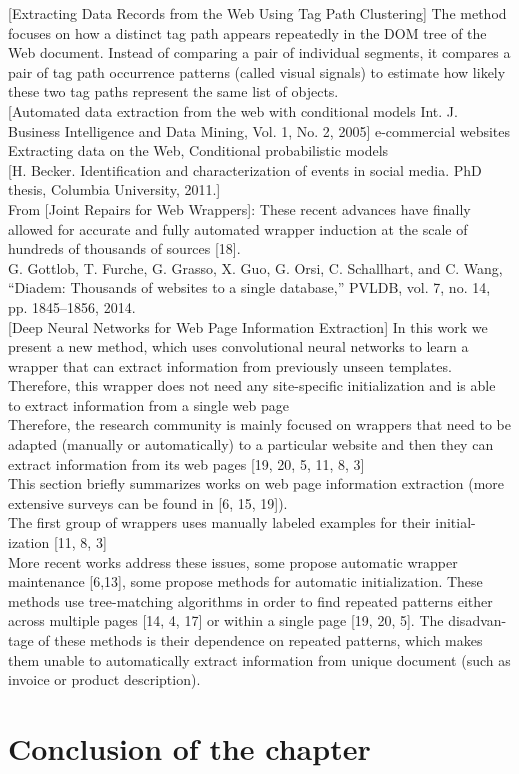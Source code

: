 [Extracting Data Records from the Web Using Tag Path Clustering]
The method focuses on how a distinct tag path appears repeatedly in the DOM tree of the Web document. Instead of comparing a pair of individual segments, it compares a pair of tag path occurrence patterns (called visual signals) to estimate how likely these two tag paths represent the same list of objects.\\

[Automated data extraction from the web with conditional models Int. J. Business Intelligence and Data Mining, Vol. 1, No. 2, 2005] e-commercial websites Extracting data on the Web, Conditional probabilistic models\\


[H. Becker. Identification and characterization of events in social media. PhD thesis, Columbia University, 2011.]\\

From [Joint Repairs for Web Wrappers]:
These recent advances have finally allowed for accurate and fully automated wrapper induction at the scale of hundreds of thousands of sources [18].\\
[18] G. Gottlob, T. Furche, G. Grasso, X. Guo, G. Orsi, C. Schallhart, and C. Wang, “Diadem: Thousands of websites to a single database,” PVLDB, vol. 7, no. 14, pp. 1845–1856, 2014.\\

[Deep Neural Networks for Web Page Information Extraction] In this work we present a new method, which uses convolutional neural networks to learn a wrapper that can extract information from previously unseen templates. Therefore, this wrapper does not need any site-specific initialization and is able to extract information from a single web page\\ Therefore, the research community is mainly focused on wrappers that need to be adapted (manually or automatically) to a particular website and then they can extract information from its web pages [19, 20, 5, 11, 8, 3]\\
This section briefly summarizes works on web page information extraction (more extensive surveys can be found in [6, 15, 19]). \\
The first group of wrappers uses manually labeled examples for their initial- ization [11, 8, 3]\\
More recent works address these issues, some propose automatic wrapper maintenance [6,13], some propose methods for automatic initialization. These methods use tree-matching algorithms in order to find repeated patterns either across multiple pages [14, 4, 17] or within a single page [19, 20, 5]. The disadvan- tage of these methods is their dependence on repeated patterns, which makes them unable to automatically extract information from unique document (such as invoice or product description).\\



\section*{Conclusion of the chapter}